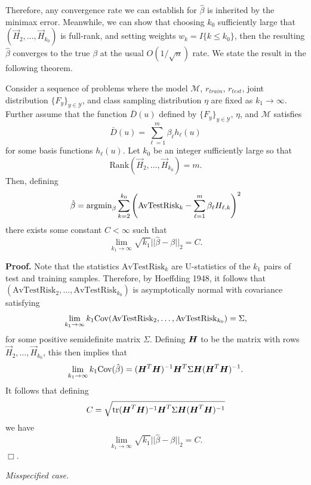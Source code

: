 \documentclass[12pt]{article}
\begin{document}
Therefore, any convergence rate we can establish for $\hat{\beta}$ is
inherited by the minimax error.  Meanwhile, we can show that choosing
$k_0$ sufficiently large that $(\vec{H}_2,\hdots,\vec{H}_{k_0})$ is
full-rank, and setting weights $w_k = I\{k \leq k_0\}$, then the
resulting $\hat{\beta}$ converges to the true $\beta$ at the usual
$O(1/\sqrt{n})$ rate.  We state the result in the following theorem.

\begin{theorem}
Consider a sequence of problems where the model $\mathcal{M}$,
$r_{train}$, $r_{test}$, joint distribution
$\{F_y\}_{y \in \mathcal{Y}}$, and class sampling distribution $\eta$
are fixed as $k_1 \to \infty$.  Further assume that the function
$\bar{D}(u)$ defined by $\{F_y\}_{y \in \mathcal{Y}}$, $\eta$, and
$\mathcal{M}$ satisfies
\[
\bar{D}(u) = \sum_{\ell = 1}^m \beta_\ell h_\ell(u)
\]
for some basis functions $h_\ell(u)$.
Let $k_0$ be an integer sufficiently large so that
\[
\text{Rank}(\vec{H}_2,\hdots,\vec{H}_{k_0}) = m.
\]
Then, defining
\[
\hat{\beta} = \text{argmin}_\beta \sum_{k=2}^{k_0} \left(\text{AvTestRisk}_k - \sum_{\ell=1}^m \beta_\ell H_{\ell, k}\right)^2
\]
there exists some constant $C < \infty$ such that
\[
\lim_{k_1 \to \infty} \sqrt{k_1}||\hat{\beta}-\beta||_2 = C.
\]
\end{theorem}

\textbf{Proof.}
Note that the statistics $\text{AvTestRisk}_k$ are U-statistics of the
$k_1$ pairs of test and training samples.  Therefore, by Hoeffding
1948, it follows that
$(\text{AvTestRisk}_2,\hdots, \text{AvTestRisk}_{k_0})$ is
asymptotically normal with covariance satisfying
\[
\lim_{k_1 \to \infty} k_1 \text{Cov}(\text{AvTestRisk}_2,\hdots, \text{AvTestRisk}_{k_0}) = \Sigma,
\]
for some positive semidefinite matrix $\Sigma$.  Defining $\boldsymbol{H}$ to be
the matrix with rows $\vec{H}_2,\hdots,\vec{H}_{k_0}$, this then
implies that
\[
\lim_{k_1 \to \infty} k_1 \text{Cov}(\hat{\beta}) = (\boldsymbol{H}^T \boldsymbol{H})^{-1} \boldsymbol{H}^T \Sigma \boldsymbol{H} (\boldsymbol{H}^T \boldsymbol{H})^{-1}.
\]
It follows that defining
\[
C = \sqrt{\text{tr} (\boldsymbol{H}^T \boldsymbol{H})^{-1} \boldsymbol{H}^T \Sigma \boldsymbol{H} (\boldsymbol{H}^T \boldsymbol{H})^{-1}}
\]
we have
\[
\lim_{k_1 \to \infty} \sqrt{k_1}||\hat{\beta}-\beta||_2 = C.
\]
$\Box$.

\noindent\emph{Misspecified case.}
\end{document}
